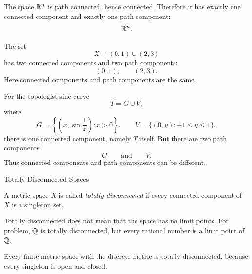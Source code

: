 \documentclass[12pt, a4paper]{article}
\begin{document}
\begin{problem}[$\R^n$]
The space $\R^n$ is path connected, hence connected. Therefore it has exactly one connected component and exactly one path component:
\[
    \mathbb{R}^n.
\]
\end{problem}

\vspace{200pt}

\begin{problem}[$(0,1)\cup(2,3)$]
The set
\[
    X=(0,1)\cup(2,3)
\]
has two connected components and two path components:
\[
    (0,1),\qquad (2,3).
\]
Here connected components and path components are the same.
\end{problem}

\clearpage

\begin{problem}
For the topologist sine curve
\[
    T=G\cup V,
\]
where
\[
    G=\left\{\left(x,\sin\frac1x\right):x>0\right\},
    \qquad
    V=\{(0,y):-1\leq y\leq 1\},
\]
there is one connected component, namely $T$ itself. But there are two path components:
\[
    G
    \qquad\text{and}\qquad
    V.
\]
Thus connected components and path components can be different.
\end{problem}

\clearpage

\begin{heading}
    Totally Disconnected Spaces
\end{heading}

\vspace{10pt}

\begin{definition}
A metric space $X$ is called \textit{totally disconnected} if every connected component of $X$ is a singleton set.
\end{definition}

\vspace{100pt}

\begin{problem}[Remark]
Totally disconnected does not mean that the space has no limit points. For problem, $\mathbb{Q}$ is totally disconnected, but every rational number is a limit point of $\mathbb{Q}$.
\end{problem}

\vspace{100pt}

\begin{problem}
Every finite metric space with the discrete metric is totally disconnected, because every singleton is open and closed.
\end{problem}
\end{document}
